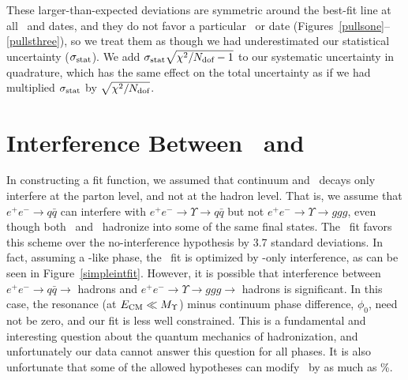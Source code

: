 \documentclass{cornell}
\begin{document}
These larger-than-expected deviations are symmetric around the
best-fit line at all \ecm\ and dates, and they do not favor a
particular \ecm\ or date (Figures~\ref{pullsone}--\ref{pullsthree}),
so we treat them as though we had underestimated our statistical
uncertainty ($\sigma_{\mbox{\scriptsize stat}}$).  We add $\sigma_{\mbox{\scriptsize stat}}
\sqrt{\chi^2/N_{\mbox{\scriptsize dof}} - 1}$ to our systematic uncertainty in
\label{sec:chichiconsistency} quadrature, which has the same effect on
the total uncertainty as if we had multiplied $\sigma_{\mbox{\scriptsize stat}}$ by
$\sqrt{\chi^2/N_{\mbox{\scriptsize dof}}}$.

\section{Interference Between \boldmath \ggg\ and \qqbar}
\label{sec:interference}

In constructing a fit function, we assumed that continuum and \ups\
decays only interfere at the parton level, and not at the hadron
level.  That is, we assume that $e^+e^- \to q\bar{q}$ can interfere
with $e^+e^- \to \Upsilon \to q\bar{q}$ but not $e^+e^- \to \Upsilon
\to ggg$, even though both \qqbar\ and \ggg\ hadronize into some of
the same final states.  The \us\ fit favors this scheme over the
no-interference hypothesis by 3.7 standard deviations.  In fact,
assuming a \qqbar-like phase, the \us\ fit is optimized by \qqbar-only
interference, as can be seen in Figure~\ref{simpleintfit}.  However,
it is possible that interference between $e^+e^- \to q\bar{q} \to$
hadrons and $e^+e^- \to \Upsilon \to ggg \to$ hadrons is significant.
In this case, the resonance (at $E_{\mbox{\scriptsize CM}} \ll M_\Upsilon$) minus
continuum phase difference, $\phi_0$, need not be zero, and our fit is
less well constrained.  This is a fundamental and interesting question
about the quantum mechanics of hadronization, and unfortunately our
data cannot answer this question for all phases.  It is also
unfortunate that some of the allowed hypotheses can modify \geehadtot\
by as much as \bork\%.
\end{document}
